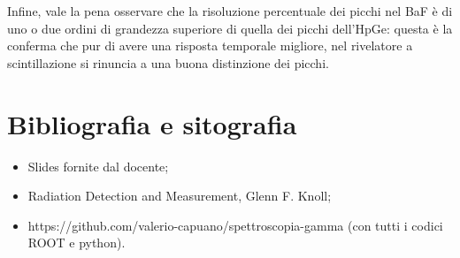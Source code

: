 \documentclass{article}
\begin{document}
            Infine, vale la pena osservare che la risoluzione percentuale dei picchi nel BaF è di uno o due ordini di grandezza superiore di quella dei picchi dell'HpGe: questa è la conferma che pur di avere una risposta temporale migliore, nel rivelatore a scintillazione si rinuncia a una buona distinzione dei picchi.

        \newpage
        \section*{Bibliografia e sitografia}
        \begin{itemize}
            \item Slides fornite dal docente;
            \item Radiation Detection and Measurement, Glenn F. Knoll;
            \item https://github.com/valerio-capuano/spettroscopia-gamma (con tutti i codici ROOT e python).
        \end{itemize}
        
        
            
\end{document}
